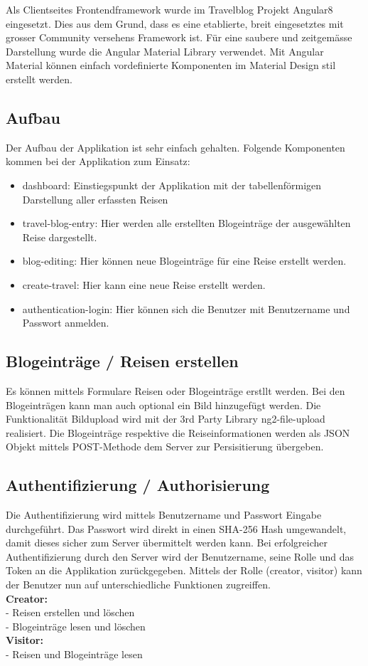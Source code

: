 \documentclass[../main.tex]{subfiles}
\begin{document}
Als Clientseites Frontendframework wurde im Travelblog Projekt Angular8 eingesetzt. Dies aus dem Grund, dass es eine etablierte, breit eingesetztes mit grosser Community versehens Framework ist. Für eine saubere und zeitgemässe Darstellung wurde die Angular Material Library verwendet. Mit Angular Material können einfach vordefinierte Komponenten im Material Design stil erstellt werden.\\
\subsection{Aufbau}
Der Aufbau der Applikation ist sehr einfach gehalten. Folgende Komponenten kommen bei der Applikation zum Einsatz:
\begin{itemize}
    \item dashboard: Einstiegspunkt der Applikation mit der tabellenförmigen Darstellung aller erfassten Reisen
    \item travel-blog-entry: Hier werden alle erstellten Blogeinträge der ausgewählten Reise dargestellt. 
    \item blog-editing: Hier können neue Blogeinträge für eine Reise erstellt werden.
    \item create-travel: Hier kann eine neue Reise erstellt werden.
    \item authentication-login: Hier können sich die Benutzer mit Benutzername und Passwort anmelden.
\end{itemize}

\subsection{Blogeinträge / Reisen erstellen}
Es können mittels Formulare Reisen oder Blogeinträge erstllt werden. Bei den Blogeinträgen kann man auch optional ein Bild hinzugefügt werden. Die Funktionalität Bildupload wird mit der 3rd Party Library ng2-file-upload realisiert. Die Blogeinträge respektive die Reiseinformationen werden als JSON Objekt mittels POST-Methode dem Server zur Persisitierung übergeben.

\subsection{Authentifizierung / Authorisierung}
Die Authentifizierung wird mittels Benutzername und Passwort Eingabe durchgeführt. Das Passwort wird direkt in einen SHA-256 Hash umgewandelt, damit dieses sicher zum Server übermittelt werden kann. Bei erfolgreicher Authentifizierung durch den Server wird der Benutzername, seine Rolle und das Token an die Applikation zurückgegeben. Mittels der Rolle (creator, visitor) kann der Benutzer nun auf unterschiedliche Funktionen zugreiffen.\\

\textbf{Creator:}\\
- Reisen erstellen und löschen \\
- Blogeinträge lesen und löschen\\

\textbf{Visitor:}\\
- Reisen und Blogeinträge lesen\\
\end{document}
